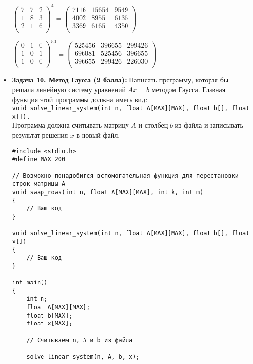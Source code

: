 \documentclass{article}
\begin{document}
\begin{itemize}
\begin{center}
$
\begin{pmatrix}
7 & 7 & 2 \\
1 & 8 & 3 \\
2 & 1 & 6 \\
\end{pmatrix}^4 = 
\begin{pmatrix}
7116 & 15654 & 9549 \\
4002 & 8955 & 6135 \\
3369 & 6165 & 4350 \\
\end{pmatrix}
$
\end{center}

\begin{center}
$
\begin{pmatrix}
0 & 1 & 0 \\
1 & 0 & 1 \\
1 & 0 & 0 \\
\end{pmatrix}^{50} = 
\begin{pmatrix}
525456 & 396655 & 299426 \\
696081 & 525456 & 396655 \\
396655 & 299426 & 226030 \\
\end{pmatrix}
$
\end{center}
\item \textbf{Задача 10. Метод Гаусса (2 балла):} 
Написать программу, которая бы решала линейную систему уравнений $Ax = b$ методом Гаусса. Главная функция этой программы должна иметь вид: \\ \texttt{void solve\_linear\_system(int n, float A[MAX][MAX], float b[], float x[]).} \\
Программа должна считывать матрицу $A$ и столбец $b$ из файла и записывать результат решения $x$ в новый файл.
\begin{lstlisting}
#include <stdio.h>
#define MAX 200

// Возможно понадобится вспомогательная функция для перестановки строк матрицы A
void swap_rows(int n, float A[MAX][MAX], int k, int m)
{
    // Ваш код
}

void solve_linear_system(int n, float A[MAX][MAX], float b[], float x[])
{
    // Ваш код
}

int main()
{
    int n;
    float A[MAX][MAX];
    float b[MAX];
    float x[MAX];
    
    // Считываем n, A и b из файла
	
    solve_linear_system(n, A, b, x);
    

\end{lstlisting}
\end{itemize}
\end{document}
